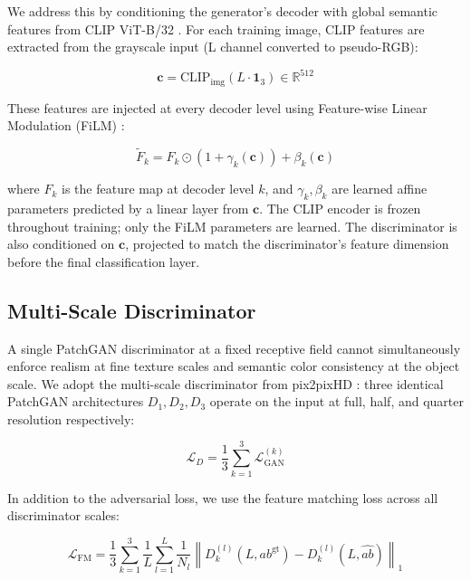 \documentclass[12pt, a4paper, oneside]{report}
\begin{document}
    We address this by conditioning the generator's decoder with global semantic
    features from CLIP ViT-B/32 \cite{radford2021learning}. For each training image,
    CLIP features are extracted from the grayscale input (L channel converted to
    pseudo-RGB):

    \begin{equation}
        \mathbf{c} = \text{CLIP}_{\text{img}}(L \cdot \mathbf{1}_3) \in \mathbb{R}^{512}
    \end{equation}

    These features are injected at every decoder level using Feature-wise Linear
    Modulation (FiLM) \cite{perez2018film}:

    \begin{equation}
        \tilde{F}_k = F_k \odot (1 + \gamma_k(\mathbf{c})) + \beta_k(\mathbf{c})
    \end{equation}

    where $F_k$ is the feature map at decoder level $k$, and $\gamma_k, \beta_k$
    are learned affine parameters predicted by a linear layer from $\mathbf{c}$.
    The CLIP encoder is frozen throughout training; only the FiLM parameters are
    learned. The discriminator is also conditioned on $\mathbf{c}$, projected to
    match the discriminator's feature dimension before the final classification layer.

    \subsection{Multi-Scale Discriminator}
    \label{sec:multiscale}

    A single PatchGAN discriminator at a fixed receptive field cannot simultaneously
    enforce realism at fine texture scales and semantic color consistency at the
    object scale. We adopt the multi-scale discriminator from pix2pixHD
    \cite{wang2018high}: three identical PatchGAN architectures $D_1, D_2, D_3$
    operate on the input at full, half, and quarter resolution respectively:

    \begin{equation}
        \mathcal{L}_D = \frac{1}{3} \sum_{k=1}^{3} \mathcal{L}_{\text{GAN}}^{(k)}
    \end{equation}

    In addition to the adversarial loss, we use the feature matching loss
    \cite{wang2018high} across all discriminator scales:

    \begin{equation}
        \mathcal{L}_{\text{FM}} = \frac{1}{3} \sum_{k=1}^{3}
        \frac{1}{L} \sum_{l=1}^{L}
        \frac{1}{N_l} \left\| D_k^{(l)}(L, ab^{\text{gt}})
        - D_k^{(l)}(L, \hat{ab}) \right\|_1
    \end{equation}
\end{document}
